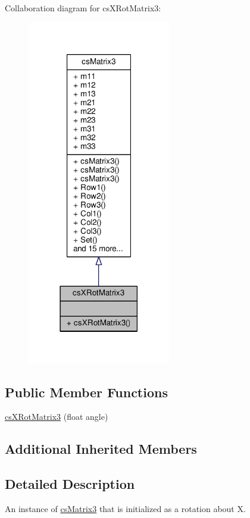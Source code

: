 Collaboration diagram for cs\+X\+Rot\+Matrix3\+:
\nopagebreak
\begin{figure}[H]
\begin{center}
\leavevmode
\includegraphics[width=177pt]{d2/de2/classcsXRotMatrix3__coll__graph}
\end{center}
\end{figure}
\subsection*{Public Member Functions}
\begin{DoxyCompactItemize}
\item 
\hyperlink{classcsXRotMatrix3_af033eb7d179bc46a5f566f234a45c2d9}{cs\+X\+Rot\+Matrix3} (float angle)
\end{DoxyCompactItemize}
\subsection*{Additional Inherited Members}


\subsection{Detailed Description}
An instance of \hyperlink{classcsMatrix3}{cs\+Matrix3} that is initialized as a rotation about X. 


